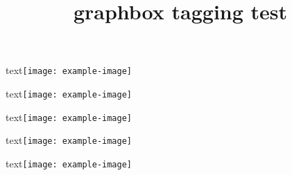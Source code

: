 \documentclass{article}
\title{graphbox tagging test}
\begin{document}
text\texttt{[image: example-image]}

text\texttt{[image: example-image]}

text\texttt{[image: example-image]}

text\texttt{[image: example-image]}

text\texttt{[image: example-image]}
\end{document}
